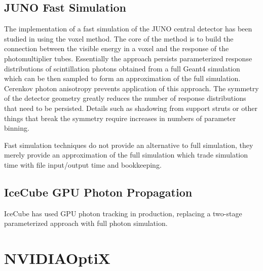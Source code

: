 \documentclass[a4paper]{jpconf}
\begin{document}
\subsection{JUNO Fast Simulation}

The implementation of a fast simulation of the JUNO central detector has 
been studied in\cite{junoFastSim} using the voxel method. The core
of the method is to build the connection between the visible energy
in a voxel and the response of the photomultiplier tubes.
Essentially the approach persists parameterized response distributions 
of scintillation photons obtained from a full Geant4 simulation which 
can be then sampled to form an approximation of the full simulation.
Cerenkov photon anisotropy prevents application of this approach.
The symmetry of the detector geometry greatly reduces the number of 
response distributions that need to be persisted. Details such as 
shadowing from support struts or other things that break the symmetry 
require increases in numbers of parameter binning.  

Fast simulation techniques do not provide an alternative to full simulation, 
they merely provide an approximation of the full simulation which trade 
simulation time with file input/output time and bookkeeping. 
  
\subsection{IceCube GPU Photon Propagation}

IceCube\cite{IceCubeGPU} has used GPU photon tracking in production, replacing 
a two-stage parameterized approach with full photon simulation. 












\section{NVIDIA\textregistered OptiX\texttrademark}
\end{document}
